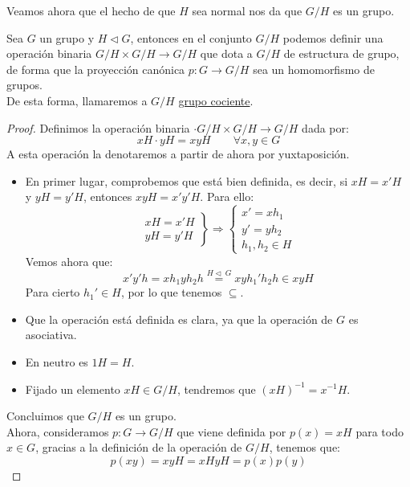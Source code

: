 Veamos ahora que el hecho de que $H$ sea normal nos da que $G/H$ es un grupo.

\begin{teo}
    Sea $G$ un grupo y $H\lhd G$, entonces en el conjunto $G/H$ podemos definir una operación binaria $G/H\times G/H\longrightarrow G/H$ que dota a $G/H$ de estructura de grupo, de forma que la proyección canónica $p:G\to G/H$ sea un homomorfismo de grupos.\\

    \noindent
    De esta forma, llamaremos a $G/H$ \underline{grupo cociente}.
    \begin{proof}
        Definimos la operación binaria $\cdot G/H\times G/H\longrightarrow G/H$ dada por:
        \begin{equation*}
            xH\cdot yH = xyH \qquad \forall x,y\in G
        \end{equation*}
        A esta operación la denotaremos a partir de ahora por yuxtaposición.
        \begin{itemize}
            \item En primer lugar, comprobemos que está bien definida, es decir, si $xH = x'H$ y $yH=y'H$, entonces $xyH = x'y'H$. Para ello:
                \begin{equation*}
                    \left.\begin{array}{l}
                        xH = x'H \\
                        yH = y'H
                    \end{array}\right\} \Longrightarrow \left\{\begin{array}{l}
                        x'= xh_1 \\
                        y' = yh_2 \\
                        h_1,h_2\in H
                    \end{array}\right.
                \end{equation*}
                Vemos ahora que:
                \begin{equation*}
                    x'y'h = xh_1yh_2h \stackrel{H\lhd\ G}{=} xyh_1'h_2h \in xyH
                \end{equation*}
                Para cierto $h_1'\in H$, por lo que tenemos $\subseteq$.
            \item Que la operación está definida es clara, ya que la operación de $G$ es asociativa.
            \item En neutro es $1H = H$.
            \item Fijado un elemento $xH \in G/H$, tendremos que ${(xH)}^{-1} = x^{-1}H$.
        \end{itemize}
        Concluimos que $G/H$ es un grupo.\\

        \noindent
        Ahora, consideramos $p:G\rightarrow G/H$ que viene definida por $p(x) = xH$ para todo $x\in G$, gracias a la definición de la operación de $G/H$, tenemos que:
        \begin{equation*}
            p(xy) = xyH = xHyH = p(x)p(y)
        \end{equation*}
    \end{proof}
\end{teo}
